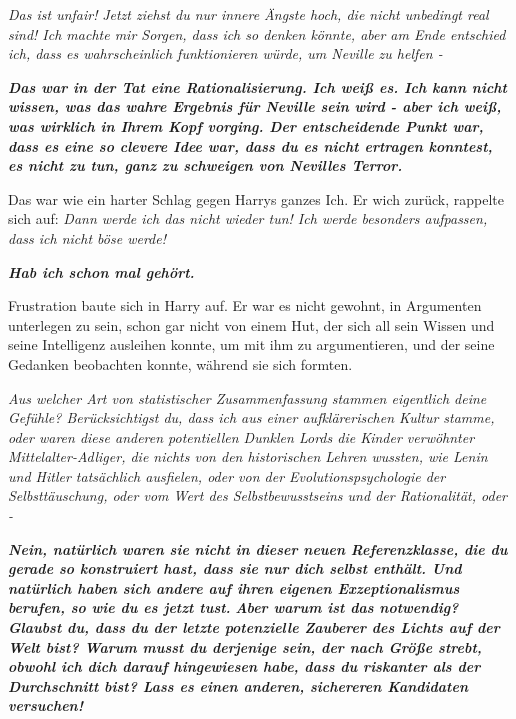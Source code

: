 \emph{ Das ist unfair! }\emph{ Jetzt ziehst du nur innere Ängste hoch, die nicht
unbedingt real sind! Ich machte mir Sorgen, dass ich so denken könnte, aber am
Ende entschied ich, dass es wahrscheinlich funktionieren würde, um Neville zu
helfen -}

\textbf{\emph{ \glqq Das war in der Tat eine Rationalisierung. Ich weiß es. Ich
kann nicht wissen, was das wahre Ergebnis für Neville sein wird - aber ich weiß,
was wirklich in Ihrem Kopf vorging. Der entscheidende Punkt war, dass es eine so
clevere Idee war, dass du es nicht ertragen konntest, es nicht zu tun, ganz zu
schweigen von Nevilles Terror.\grqq{} }}

Das war wie ein harter Schlag gegen Harrys ganzes Ich. Er wich zurück, rappelte
sich auf: \emph{Dann werde ich das nicht wieder tun! Ich werde besonders
aufpassen, dass ich nicht böse werde!}

\textbf{\emph{\glqq Hab ich schon mal gehört.\grqq{} }}

Frustration baute sich in Harry auf. Er war es nicht gewohnt, in Argumenten
unterlegen zu sein, schon gar nicht von einem Hut, der sich all sein Wissen und
seine Intelligenz ausleihen konnte, um mit ihm zu argumentieren, und der seine
Gedanken beobachten konnte, während sie sich formten.

\emph{ Aus welcher Art von statistischer Zusammenfassung stammen eigentlich
deine \glqq Gefühle\grqq{}? Berücksichtigst du, dass ich aus einer
aufklärerischen Kultur stamme, oder waren diese anderen potentiellen Dunklen
Lords die Kinder verwöhnter Mittelalter-Adliger, die nichts von den historischen
Lehren wussten, wie Lenin und Hitler tatsächlich ausfielen, oder von der
Evolutionspsychologie der Selbsttäuschung, oder vom Wert des Selbstbewusstseins
und der Rationalität, oder -}

\textbf{\emph{ \glqq Nein, natürlich waren sie nicht in dieser neuen
Referenzklasse, die du gerade so konstruiert hast, dass sie nur dich selbst
enthält. Und natürlich haben sich andere auf ihren eigenen Exzeptionalismus
berufen, so wie du es jetzt tust.}} \textbf{\emph{ Aber warum ist das notwendig?
Glaubst du, dass du der letzte potenzielle Zauberer des Lichts auf der Welt
bist? Warum musst du derjenige sein, der nach Größe strebt, obwohl ich dich
darauf hingewiesen habe, dass du riskanter als der Durchschnitt bist? Lass es
einen anderen, sichereren Kandidaten versuchen!\grqq{} }}


